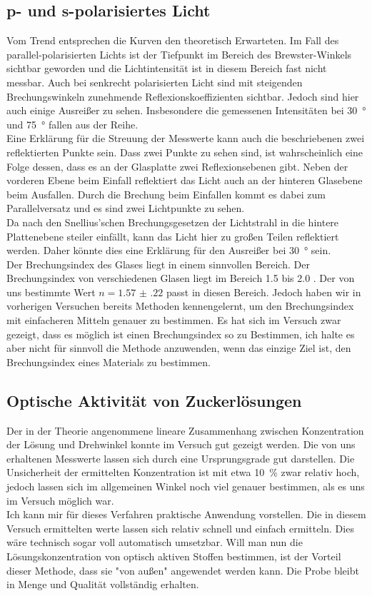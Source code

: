 \subsection{p- und s-polarisiertes Licht}
Vom Trend entsprechen die Kurven den theoretisch Erwarteten. Im Fall des parallel-polarisierten Lichts ist der Tiefpunkt im Bereich des Brewster-Winkels sichtbar geworden und die Lichtintensität ist in diesem Bereich fast nicht messbar. Auch bei senkrecht polarisierten Licht sind mit steigenden Brechungswinkeln zunehmende Reflexionskoeffizienten sichtbar. Jedoch sind hier auch einige Ausreißer zu sehen. Insbesondere die gemessenen Intensitäten bei \SI{30}{\degree} und \SI{75}{\degree} fallen aus der Reihe. \\
Eine Erklärung für die Streuung der Messwerte kann auch die beschriebenen zwei reflektierten Punkte sein. Dass zwei Punkte zu sehen sind, ist wahrscheinlich eine Folge dessen, dass es an der Glasplatte zwei Reflexionsebenen gibt. Neben der vorderen Ebene beim Einfall reflektiert das Licht auch an der hinteren Glasebene beim Ausfallen. Durch die Brechung beim Einfallen kommt es dabei zum Parallelversatz und es sind zwei Lichtpunkte zu sehen. \\
Da nach den Snellius'schen Brechungsgesetzen der Lichtstrahl in die hintere Plattenebene steiler einfällt, kann das Licht hier zu großen Teilen reflektiert werden. Daher könnte dies eine Erklärung für den Ausreißer bei \SI{30}{\degree} sein. \\
Der Brechungsindex des Glases liegt in einem sinnvollen Bereich. Der Brechungsindex von verschiedenen Glasen liegt im Bereich \num{1,5} bis \num{2.0} \cite{wiki:brech}. Der von uns bestimmte Wert $ n = \num{1.57(22)} $ passt in diesen Bereich. Jedoch haben wir in vorherigen Versuchen bereits Methoden kennengelernt, um den Brechungsindex mit einfacheren Mitteln genauer zu bestimmen. Es hat sich im Versuch zwar gezeigt, dass es möglich ist einen Brechungsindex so zu Bestimmen, ich halte es aber nicht für sinnvoll die Methode anzuwenden, wenn das einzige Ziel ist, den Brechungsindex eines Materials zu bestimmen.

\subsection{Optische Aktivität von Zuckerlösungen}
Der in der Theorie angenommene lineare Zusammenhang zwischen Konzentration der Lösung und Drehwinkel konnte im Versuch gut gezeigt werden. Die von uns erhaltenen Messwerte lassen sich durch eine Ursprungsgrade gut darstellen. Die Unsicherheit der ermittelten Konzentration ist mit etwa \SI{10}{\percent} zwar relativ hoch, jedoch lassen sich im allgemeinen Winkel noch viel genauer bestimmen, als es uns im Versuch möglich war. \\
Ich kann mir für dieses Verfahren praktische Anwendung vorstellen. Die in diesem Versuch ermittelten werte lassen sich relativ schnell und einfach ermitteln. Dies wäre technisch sogar voll automatisch umsetzbar. Will man nun die Lösungskonzentration von optisch aktiven Stoffen bestimmen, ist der Vorteil dieser Methode, dass sie "von außen" angewendet werden kann. Die Probe bleibt in Menge und Qualität vollständig erhalten.

